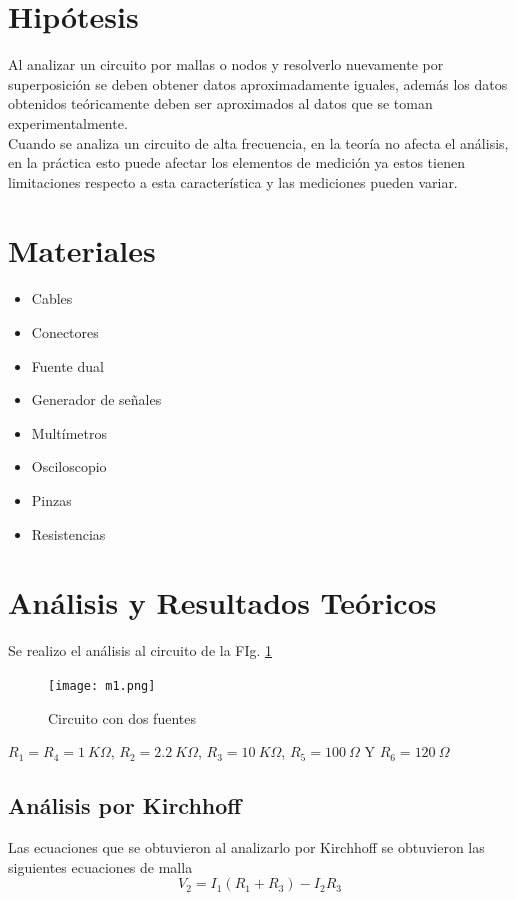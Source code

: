 \documentclass[twocolumn]{IEEEtran}
\begin{document}
\section{Hipótesis}
\noindent
Al analizar un circuito por mallas o nodos y resolverlo nuevamente por superposición se deben obtener datos aproximadamente iguales,  además los datos obtenidos teóricamente deben ser aproximados al datos que se toman experimentalmente.\\
Cuando se  analiza un circuito de alta frecuencia, en la teoría no afecta el análisis, en la práctica esto puede afectar los elementos de medición ya estos tienen limitaciones respecto a esta característica y las mediciones pueden variar.

\section{Materiales}
\begin{itemize}
 \item Cables
 \item Conectores
 \item Fuente dual
 \item Generador de señales
 \item Multímetros
 \item Osciloscopio
 \item Pinzas
 \item Resistencias
\end{itemize}

\section{Análisis y Resultados Teóricos}
\noindent
Se realizo el análisis al circuito de la FIg. \ref{fig1}
\begin{figure}[H]
	\centering
		\texttt{[image: m1.png]}
	\caption{Circuito con dos fuentes}
	\label{fig1}
\end{figure}
\noindent
$R_1=R_4=1\ K \Omega$, $R_2=2.2 \ K \Omega$, $R_3=10 \ K \Omega$, $R_5= 100 \ \Omega$ Y $R_6 = 120 \ \Omega$

\subsection{Análisis por Kirchhoff}
\noindent
Las ecuaciones que se obtuvieron al analizarlo por Kirchhoff se obtuvieron las siguientes ecuaciones de malla
\begin{equation}
 {V_2} = {I_1}\left( {{R_1} + {R_3}} \right) - {I_2}{R_3}
\label{ecu1}
\end{equation}
\end{document}
